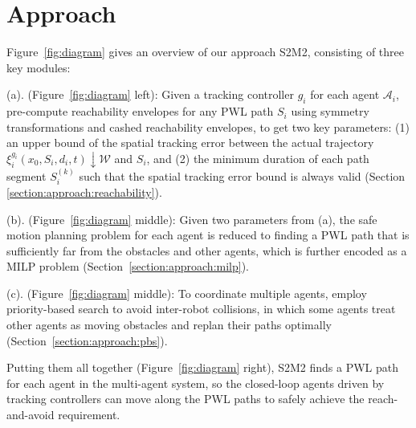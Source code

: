\documentclass[letterpaper]{article} %
\theoremstyle{definition}
\begin{document}
\section{Approach}\label{section:approach}
Figure~\ref{fig:diagram} gives an overview of our approach S2M2, consisting of three key modules: 
\begin{inparaenum}
    \item[(a).] (Figure~\ref{fig:diagram} left): Given a tracking controller $g_i$ for each agent $\mathcal{A}_i$, pre-compute reachability envelopes for any PWL path $S_i$ using symmetry transformations and cashed reachability envelopes, to get two key parameters: (1) an upper bound of the spatial tracking error between the actual trajectory $\xi_i^{g_i}(x_0, S_i, d_i, t) \downarrow \mathcal{W}$ and $S_i$, and (2) the minimum duration of each path segment $S_i^{(k)}$ such that the spatial tracking error bound is always valid (Section \ref{section:approach:reachability}). 
    \item[(b).]  (Figure~\ref{fig:diagram} middle): Given two parameters from (a), the safe motion planning problem for each agent is reduced to finding a PWL path that is sufficiently far from the obstacles and other agents, which is further encoded as a MILP problem (Section~\ref{section:approach:milp}).
    \item[(c).] (Figure~\ref{fig:diagram} middle): To coordinate multiple agents, employ priority-based search to avoid inter-robot collisions, in which some agents treat other agents as moving obstacles and replan their paths optimally (Section~\ref{section:approach:pbs}). 
\end{inparaenum}
Putting them all together (Figure~\ref{fig:diagram} right), S2M2 finds a PWL path for each agent in the multi-agent system, so the closed-loop agents driven by tracking controllers can move along the PWL paths to 
safely achieve the reach-and-avoid requirement. 

\end{document}
